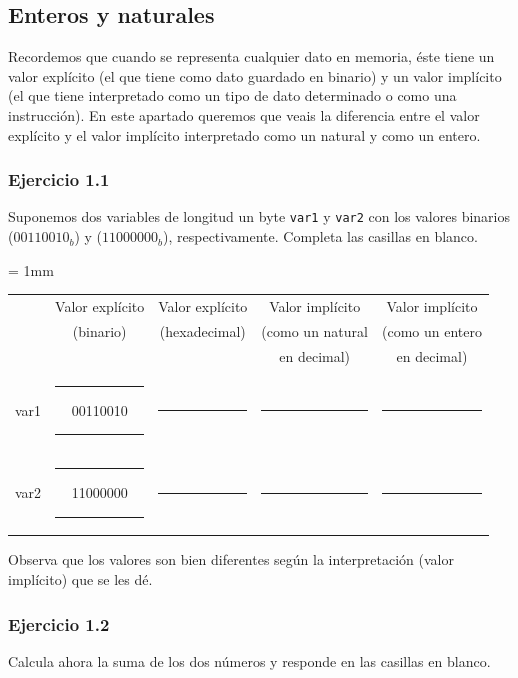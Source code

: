 \subsection{Enteros y naturales}

Recordemos que cuando se representa cualquier dato en memoria, éste tiene un
valor explícito (el que tiene como dato guardado en binario) y un
valor implícito (el que tiene interpretado como un tipo de dato
determinado o como una instrucción). En este apartado queremos que veais la
diferencia entre el valor explícito y el valor implícito interpretado como
un natural y como un entero.

\subsubsection{Ejercicio 1.1}
Suponemos dos variables de longitud un byte {\tt var1}
y {\tt var2} con los valores binarios ($00110010_b$) y ($11000000_b$),
respectivamente. Completa las casillas en blanco.

\begin{center}
\small
\colorbox[gray]{0.9}{
\tabcolsep = 1mm
\begin{tabular}{ccccc}
& Valor explícito & Valor explícito & Valor implícito & Valor implícito \\
 & (binario) & (hexadecimal) & (como un natural & (como un entero \\
& & & en decimal) & en decimal) \\
var1 &
\colorbox[gray]{1}{\rule{0cm}{0.46cm}\rule{0.2cm}{0cm}00110010\rule{0.2cm}{0cm}} &
\colorbox[gray]{1}{\rule{0cm}{0.46cm}\rule{2.6cm}{0cm}} &
\colorbox[gray]{1}{\rule{0cm}{0.46cm}\rule{2.6cm}{0cm}} &
\colorbox[gray]{1}{\rule{0cm}{0.46cm}\rule{2.6cm}{0cm}} \\[1mm]
var2 &
\colorbox[gray]{1}{\rule{0cm}{0.46cm}\rule{0.2cm}{0cm}11000000\rule{0.2cm}{0cm}} &
\colorbox[gray]{1}{\rule{0cm}{0.46cm}\rule{2.6cm}{0cm}} &
\colorbox[gray]{1}{\rule{0cm}{0.46cm}\rule{2.6cm}{0cm}} &
\colorbox[gray]{1}{\rule{0cm}{0.46cm}\rule{2.6cm}{0cm}} \\
\end{tabular}
\vspace{0.5ex}
}
\end{center}

Observa que los valores son bien diferentes según la interpretación (valor
implícito) que se les dé.

\subsubsection{Ejercicio 1.2}
Calcula ahora la suma de los dos números y responde en las casillas en blanco.

